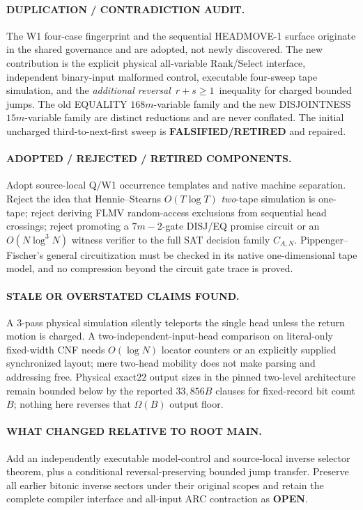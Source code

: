 \documentclass[11pt]{article}
\begin{document}
\paragraph{DUPLICATION / CONTRADICTION AUDIT.} The W1 four-case
fingerprint and the sequential HEADMOVE-1 surface originate in the
shared governance and are adopted, not newly discovered. The new
contribution is the explicit physical all-variable Rank/Select
interface, independent binary-input malformed control, executable
four-sweep tape simulation, and the \emph{additional reversal}
$\,r+s\ge1\,$ inequality for charged bounded jumps.
The old EQUALITY $168m$-variable family and the new DISJOINTNESS
$15m$-variable family are distinct reductions and are never
conflated. The initial uncharged third-to-next-first sweep is
\textbf{FALSIFIED/RETIRED} and repaired.

\paragraph{ADOPTED / REJECTED / RETIRED COMPONENTS.}
Adopt source-local Q/W1 occurrence templates and native machine
separation. Reject the idea that Hennie--Stearns $O(T\log T)$
\emph{two}-tape simulation is one-tape; reject deriving FLMV
random-access exclusions from sequential head crossings; reject
promoting a $7m-2$-gate DISJ/EQ promise circuit or an
$O(N\log^3 N)$ witness verifier to the full SAT decision
family $C_{A,N}$.  Pippenger--Fischer's general circuitization
must be checked in its native one-dimensional tape model, and no
compression beyond the circuit gate trace is proved.

\paragraph{STALE OR OVERSTATED CLAIMS FOUND.} A 3-pass physical
simulation silently teleports the single head unless the return
motion is charged. A two-independent-input-head comparison on
literal-only fixed-width CNF needs $O(\log N)$ locator counters
or an explicitly supplied synchronized layout; mere two-head
mobility does not make parsing and addressing free.
Physical exact22 output sizes in the pinned two-level architecture
remain bounded below by the reported $33{,}856B$ clauses for
fixed-record bit count $B$; nothing here reverses that
$\Omega(B)$ output floor.

\paragraph{WHAT CHANGED RELATIVE TO ROOT MAIN.} Add an
independently executable model-control and source-local inverse
selector theorem, plus a conditional reversal-preserving bounded
jump transfer. Preserve all earlier bitonic inverse sectors under
their original scopes and retain the complete compiler interface
and all-input ARC contraction as \textbf{OPEN}.
\end{document}
